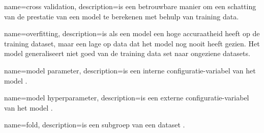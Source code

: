 {
    name=cross validation,
    description={is een betrouwbare manier om een schatting van de prestatie van een model te berekenen met behulp van training data.}
}

{
    name=overfitting,
    description={is als een model een hoge accuraatheid heeft op de training dataset, maar een lage op data dat het model nog nooit heeft gezien. Het model generaliseert niet goed van de training data set naar ongeziene datasets.}
}

{
    name=model parameter,
    description={is een interne configuratie-variabel van het model \cite{ml-model-hyper-parameter-brownlee}.}
}

{
    name=model hyperparameter,
    description={is een externe configuratie-variabel van het model \cite{ml-model-hyper-parameter-brownlee}.}
}

{
    name=fold,
    description={is een subgroep van een dataset \cite{data-science-primer}.}
}

